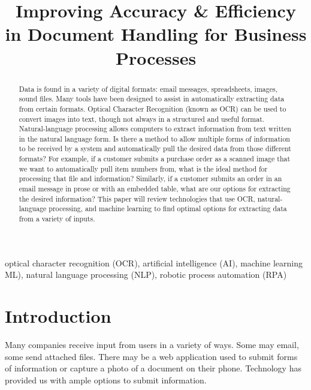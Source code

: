 \documentclass[conference, draftcls]{IEEEtran}
\begin{document}
\title{Improving Accuracy \& Efficiency in Document Handling for Business Processes}

\author{
}

\maketitle

\begin{abstract}
Data is found in a variety of digital formats: email messages, spreadsheets, images, sound files. Many tools have been designed to assist in automatically extracting data from certain formats. Optical Character Recognition (known as OCR) can be used to convert images into text, though not always in a structured and useful format. Natural-language processing allows computers to extract information from text written in the natural language form. Is there a method to allow multiple forms of information to be received by a system and automatically pull the desired data from those different formats? For example, if a customer submits a purchase order as a scanned image that we want to automatically pull item numbers from, what is the ideal method for processing that file and information? Similarly, if a customer submits an order in an email message in prose or with an embedded table, what are our options for extracting the desired information? This paper will review technologies that use OCR, natural-language processing, and machine learning to find optimal options for extracting data from a variety of inputs.
\end{abstract}

\begin{IEEEkeywords}
optical character recognition (OCR), artificial intelligence (AI), machine learning ML), natural language processing (NLP), robotic process automation (RPA)
\end{IEEEkeywords}

\section{Introduction}
Many companies receive input from users in a variety of ways. Some may email, some send attached files. There may be a web application used to submit forms of information or capture a photo of a document on their phone. Technology has provided us with ample options to submit information.
\end{document}
